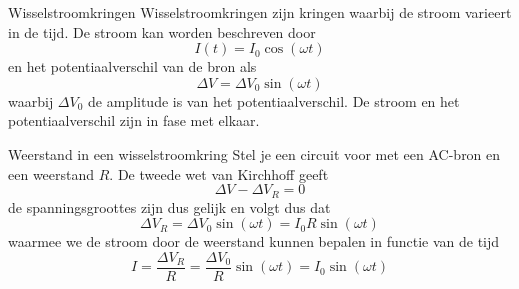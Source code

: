 \begin{theo}[Wisselstroomkringen]{Wisselstroomkringen}
    Wisselstroomkringen zijn kringen waarbij de stroom varieert in de tijd. De stroom kan worden beschreven door
    \begin{equation*}
        I(t) = I_{0}\cos(\omega t)
    \end{equation*}
    en het potentiaalverschil van de bron als
    \begin{equation*}
        \Delta V = \Delta V_{0}\sin(\omega t)
    \end{equation*}
    waarbij $\Delta V_0$ de amplitude is van het potentiaalverschil. De stroom en het potentiaalverschil zijn in fase met elkaar.
\end{theo}

\begin{pro}{Weerstand in een wisselstroomkring}
    Stel je een circuit voor met een AC-bron en een weerstand $R$. De tweede wet van Kirchhoff geeft
    \begin{equation*}
        \Delta V - \Delta V_{R} = 0
    \end{equation*}
    de spanningsgroottes zijn dus gelijk en volgt dus dat
    \begin{equation*}
        \Delta V_{R} = \Delta V_{0}\sin(\omega t) = I_{0}R\sin(\omega t)
    \end{equation*}
    waarmee we de stroom door de weerstand kunnen bepalen in functie van de tijd
    \begin{equation*}
        I = \dfrac{\Delta V_{R}}{R} = \dfrac{\Delta V_{0}}{R}\sin(\omega t) = I_{0}\sin(\omega t) 
    \end{equation*}
    \vspace{-0.5cm}
\end{pro}

\newpage

